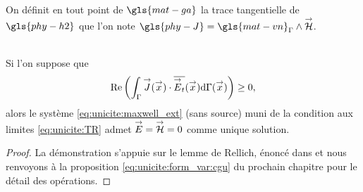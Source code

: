     On définit en tout point de \(\gls{mat-ga}\) la trace tangentielle de \(\gls{phy-h2}\) que l'on note \(\gls{phy-J} = \gls{mat-vn}_\Gamma \pvect \vH\).
    \begin{prop}~\\
      Si l'on suppose que
      \begin{equation}
        \label{prop:cgu}
        \operatorname{Re}\left(\int_\Gamma {\overset{\rightarrow}{J}}({\overset{\rightarrow}{x}}) \cdot {\overline{{\overset{\rightarrow}{E}}_t}}({\overset{\rightarrow}{x}}) \mathrm{d}{\Gamma({\overset{\rightarrow}{x}})}\right) \ge 0,
      \end{equation}
      alors le système \eqref{eq:unicite:maxwell_ext} (sans source) muni de la condition aux limites \eqref{eq:unicite:TR} admet \({\overset{\rightarrow}{E}}={\overset{\rightarrow}{\mathcal{H}}}=0\) comme unique solution.
    \end{prop}
    
    \begin{proof}
      La démonstration s'appuie sur le lemme de Rellich, énoncé dans \cite[p.~74]{cessenat_mathematical_1996} et nous renvoyons à la proposition \ref{eq:unicite:form_var:cgu} du prochain chapitre pour le détail des opérations.


      

\end{proof}
